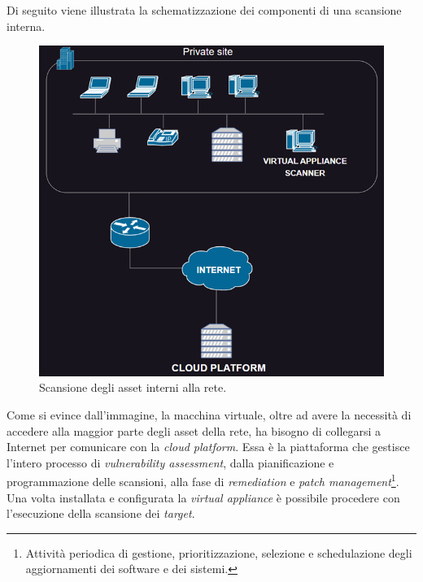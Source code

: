 \documentclass[target=mst,aauheader=]{thud}
\begin{document}
Di seguito viene illustrata la schematizzazione dei componenti di una scansione interna.

\begin{figure}[h]
\label{fig:scan_interna}
\centering
\includegraphics{images/scan_interna.png}
    \caption{Scansione degli asset interni alla rete.}
\end{figure}


Come si evince dall’immagine, la macchina virtuale, oltre ad avere la necessità di accedere alla maggior parte degli asset della rete, ha bisogno di collegarsi a Internet per comunicare con la \textit{cloud platform}. Essa è la piattaforma che gestisce l’intero processo di \textit{vulnerability assessment}, dalla pianificazione e programmazione delle scansioni, alla fase di \textit{remediation} e \textit{patch management}\footnote{Attività periodica di gestione, prioritizzazione, selezione e schedulazione degli aggiornamenti dei software e dei sistemi.}. Una volta installata e configurata la \textit{virtual appliance} è possibile procedere con l’esecuzione della scansione dei \textit{target}.
\end{document}
